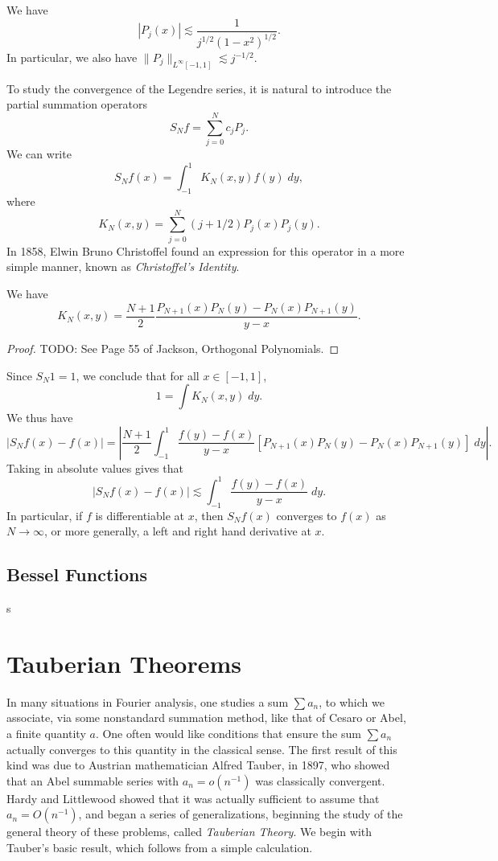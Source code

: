 \begin{theorem}
    We have
    \[ |P_j(x)| \lesssim \frac{1}{j^{1/2} (1 - x^2)^{1/2}}. \]
    In particular, we also have $\| P_j \|_{L^\infty[-1,1]} \lesssim j^{-1/2}$.
\end{theorem}

To study the convergence of the Legendre series, it is natural to introduce the partial summation operators
%
\[ S_N f = \sum_{j = 0}^N c_j P_j. \]
%
We can write
%
\[ S_N f(x) = \int_{-1}^1 K_N(x,y) f(y)\; dy, \]
%
where
%
\[ K_N(x,y) = \sum_{j = 0}^N (j + 1/2) P_j(x) P_j(y). \]
%
In 1858, Elwin Bruno Christoffel found an expression for this operator in a more simple manner, known as \emph{Christoffel's Identity}.

\begin{theorem}
    We have
    \[ K_N(x,y) = \frac{N+1}{2} \frac{P_{N+1}(x) P_N(y) - P_N(x) P_{N+1}(y)}{y - x}. \]
\end{theorem}
\begin{proof}
    TODO: See Page 55 of Jackson, Orthogonal Polynomials.
\end{proof}

Since $S_N 1 = 1$, we conclude that for all $x \in [-1,1]$,
%
\[ 1 = \int K_N(x,y)\; dy. \]
%
We thus have
%
\[ |S_N f(x) - f(x)| = \left| \frac{N+1}{2} \int_{-1}^1 \frac{f(y) - f(x)}{y - x} [ P_{N+1}(x) P_N(y) - P_N(x) P_{N+1}(y) ]\; dy \right|. \]
%
Taking in absolute values gives that
%
\[ |S_N f(x) - f(x)| \lesssim \int_{-1}^1 \frac{f(y) - f(x)}{y - x}\; dy. \]
%
In particular, if $f$ is differentiable at $x$, then $S_N f(x)$ converges to $f(x)$ as $N \to \infty$, or more generally, a left and right hand derivative at $x$.







\section{Bessel Functions}

s








\chapter{Tauberian Theorems}

In many situations in Fourier analysis, one studies a sum $\sum a_n$, to which we associate, via some nonstandard summation method, like that of Cesaro or Abel, a finite quantity $a$. One often would like conditions that ensure the sum $\sum a_n$ actually converges to this quantity in the classical sense. The first result of this kind was due to Austrian mathematician Alfred Tauber, in 1897, who showed that an Abel summable series with $a_n = o(n^{-1})$ was classically convergent. Hardy and Littlewood showed that it was actually sufficient to assume that $a_n = O(n^{-1})$, and began a series of generalizations, beginning the study of the general theory of these problems, called \emph{Tauberian Theory}. We begin with Tauber's basic result, which follows from a simple calculation.


